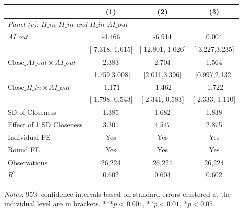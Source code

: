 \begin{table}[H]
\begin{threeparttable}
\begin{tabular}{l*{3}{c}}
\midrule
& (1) & (2) & (3) \\
\midrule
\multicolumn{4}{l}{\textit{Panel (c): $H\_{in}$-$H\_{in}$ and $H\_{in}$-$AI\_{out}$}} \\
\midrule
$AI\_{out}$  &                -4.466\sym{**} &                -6.914\sym{*}  &                 0.004         \\
            &       [-7.318,-1.615]         &      [-12.801,-1.026]         &        [-3.227,3.235]         \\
\addlinespace
$\text{Close}\_{AI\_{out}} \times AI\_{out}$&                 2.383\sym{***}&                 2.704\sym{***}&                 1.564\sym{***}\\
            &         [1.759,3.008]         &         [2.011,3.396]         &         [0.997,2.132]         \\
\addlinespace
$\text{Close}\_{H\_{in}} \times AI\_{out}$&                -1.171\sym{***}&                -1.462\sym{**} &                -1.722\sym{***}\\
            &       [-1.798,-0.543]         &       [-2.341,-0.583]         &       [-2.333,-1.110]         \\
\midrule
SD of Closeness&                 1.385         &                 1.682         &                 1.838         \\
Effect of 1 SD Closeness&                 3.301         &                 4.547         &                 2.875         \\
Individual FE&                   Yes         &                   Yes         &                   Yes         \\
Round FE    &                   Yes         &                   Yes         &                   Yes         \\
Observations&                26,224         &                26,224         &                26,224         \\
\(R^2\)     &                 0.602         &                 0.604         &                 0.602         \\
\bottomrule\bottomrule
\end{tabular}
\begin{tablenotes}
\footnotesize
\item \textit{Notes:} 95\% confidence intervals based on standard errors clustered at the individual level are in brackets. ***$p<0.001$, **$p<0.01$, *$p<0.05$.
\end{tablenotes}
\end{threeparttable}
\end{table}
